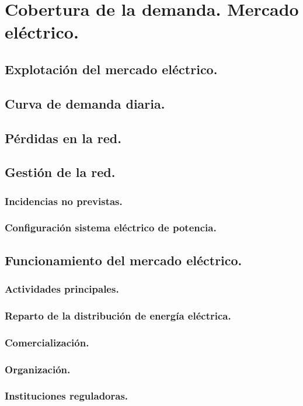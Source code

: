 \chapter{Cobertura de la demanda. Mercado eléctrico.}
\section{Explotación del mercado eléctrico.}
\section{Curva de demanda diaria.}
\section{Pérdidas en la red.}
\section{Gestión de la red.}
\subsection{Incidencias no previstas.}
\subsection{Configuración sistema eléctrico de potencia.}
\section{Funcionamiento del mercado eléctrico.}
\subsection{Actividades principales.}
\subsection{Reparto de la distribución de energía eléctrica.}
\subsection{Comercialización.}
\subsection{Organización.}
\subsection{Instituciones reguladoras.}
